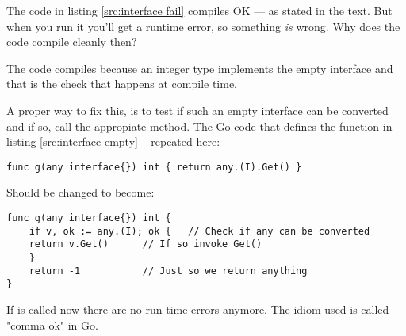 \begin{Exercise}[title={Interfaces and compilation},difficulty=6]
\Question
The code in listing \ref{src:interface fail} compiles OK --- as stated 
in the text. But when you run it you'll get a runtime error, so
something \emph{is} wrong. Why does the code compile cleanly then?
\end{Exercise}

\begin{Answer}
\Question
The code compiles because an integer type implements the empty interface
and that is the check that happens at compile time.

A proper way to fix this, is to test if such an empty interface can
be converted and if so, call the appropiate method. The Go code
that defines the function  in listing \ref{src:interface empty}
-- repeated here:
\begin{lstlisting}
func g(any interface{}) int { return any.(I).Get() }
\end{lstlisting}

\noindent{}Should be changed to become:
\begin{lstlisting}
func g(any interface{}) int {
    if v, ok := any.(I); ok {	// Check if any can be converted
	return v.Get()		// If so invoke Get()
    }
    return -1			// Just so we return anything
}
\end{lstlisting}
If  is called now there are no run-time errors anymore. The
idiom used is called "comma ok" in Go.
\end{Answer}
